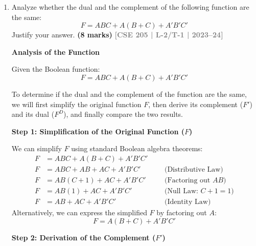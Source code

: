 \documentclass[12pt,a3paper]{article}
\newcommand{\yr}[1]{\hfill\textcolor{gray}{\small\textbf{[#1]}}}
\newcommand{\mk}[1]{\textcolor{orange!70!black}{\small\textbf{(#1 marks)}}}
\begin{document}
\begin{enumerate}
\begin{tcolorbox}[enhanced,breakable,ansbox,colback=cA!4,colframe=cA,boxrule=0.8pt,arc=5pt,title={\textbf{Answer}},fonttitle=\bfseries\color{white},colbacktitle=cA]
\[
\boxed{xy + x'z + yz = xy + x'z}
\]

\end{tcolorbox}

\item Analyze whether the dual and the complement of the following function are the same:
\[ F = ABC + A(B+C) + A'B'C' \]
Justify your answer.
\mk{8} \yr{CSE 205 | L-2/T-1 | 2023--24}

\begin{tcolorbox}[enhanced,breakable,ansbox,colback=cA!4,colframe=cA,boxrule=0.8pt,arc=5pt,title={\textbf{Answer}},fonttitle=\bfseries\color{white},colbacktitle=cA]
\textbf{Analysis of the Function}

Given the Boolean function:
\[ F = ABC + A(B+C) + A'B'C' \]

To determine if the dual and the complement of the function are the same, we will first simplify the original function $F$, then derive its complement ($F'$) and its dual ($F^D$), and finally compare the two results.

\vspace{0.5cm}
\textbf{Step 1: Simplification of the Original Function ($F$)}

We can simplify $F$ using standard Boolean algebra theorems:
\begin{align*}
F &= ABC + A(B+C) + A'B'C' \\
F &= ABC + AB + AC + A'B'C' \quad &&\text{(Distributive Law)} \\
F &= AB(C + 1) + AC + A'B'C' \quad &&\text{(Factoring out } AB \text{)} \\
F &= AB(1) + AC + A'B'C' \quad &&\text{(Null Law: } C + 1 = 1 \text{)} \\
F &= AB + AC + A'B'C' \quad &&\text{(Identity Law)}
\end{align*}
Alternatively, we can express the simplified $F$ by factoring out $A$:
\[ F = A(B+C) + A'B'C' \]

\vspace{0.5cm}
\textbf{Step 2: Derivation of the Complement ($F'$)}


\end{tcolorbox}
\end{enumerate}
\end{document}
